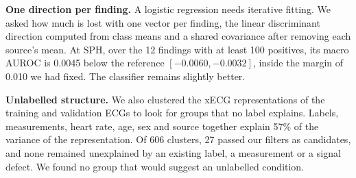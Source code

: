 \documentclass[letterpaper,11pt]{article}
\begin{document}
\textbf{One direction per finding.} A logistic regression needs iterative fitting. We asked how much is lost with one vector per finding, the linear discriminant direction computed from class means and a shared covariance after removing each source's mean. At SPH, over the 12 findings with at least 100 positives, its macro AUROC is 0.0045 below the reference $[-0.0060, -0.0032]$, inside the margin of 0.010 we had fixed. The classifier remains slightly better.

\textbf{Unlabelled structure.} We also clustered the xECG representations of the training and validation ECGs to look for groups that no label explains. Labels, measurements, heart rate, age, sex and source together explain 57\% of the variance of the representation. Of 606 clusters, 27 passed our filters as candidates, and none remained unexplained by an existing label, a measurement or a signal defect. We found no group that would suggest an unlabelled condition.
\end{document}
